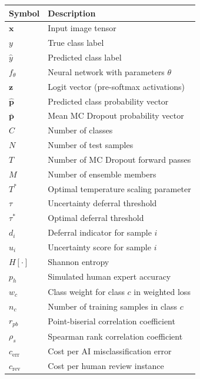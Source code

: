 \documentclass[12pt,a4paper]{report}
\begin{document}
\begin{longtable}{@{} >{\footnotesize}p{3.2cm} >{\footnotesize}p{10.6cm} @{}}
\toprule
\textbf{Symbol} & \textbf{Description} \\
\midrule
$\mathbf{x}$          & Input image tensor \\[3pt]
$y$                   & True class label \\[3pt]
$\hat{y}$             & Predicted class label \\[3pt]
$f_\theta$            & Neural network with parameters $\theta$ \\[3pt]
$\mathbf{z}$          & Logit vector (pre-softmax activations) \\[3pt]
$\hat{\mathbf{p}}$    & Predicted class probability vector \\[3pt]
$\bar{\mathbf{p}}$    & Mean MC Dropout probability vector \\[3pt]
$C$                   & Number of classes \\[3pt]
$N$                   & Number of test samples \\[3pt]
$T$                   & Number of MC Dropout forward passes \\[3pt]
$M$                   & Number of ensemble members \\[3pt]
$T^*$                 & Optimal temperature scaling parameter \\[3pt]
$\tau$                & Uncertainty deferral threshold \\[3pt]
$\tau^*$              & Optimal deferral threshold \\[3pt]
$d_i$                 & Deferral indicator for sample $i$ \\[3pt]
$u_i$                 & Uncertainty score for sample $i$ \\[3pt]
$H[\cdot]$            & Shannon entropy \\[3pt]
$p_h$                 & Simulated human expert accuracy \\[3pt]
$w_c$                 & Class weight for class $c$ in weighted loss \\[3pt]
$n_c$                 & Number of training samples in class $c$ \\[3pt]
$r_{pb}$              & Point-biserial correlation coefficient \\[3pt]
$\rho_s$              & Spearman rank correlation coefficient \\[3pt]
$c_{\text{err}}$      & Cost per AI misclassification error \\[3pt]
$c_{\text{rev}}$      & Cost per human review instance \\[3pt]

\end{longtable}
\end{document}
